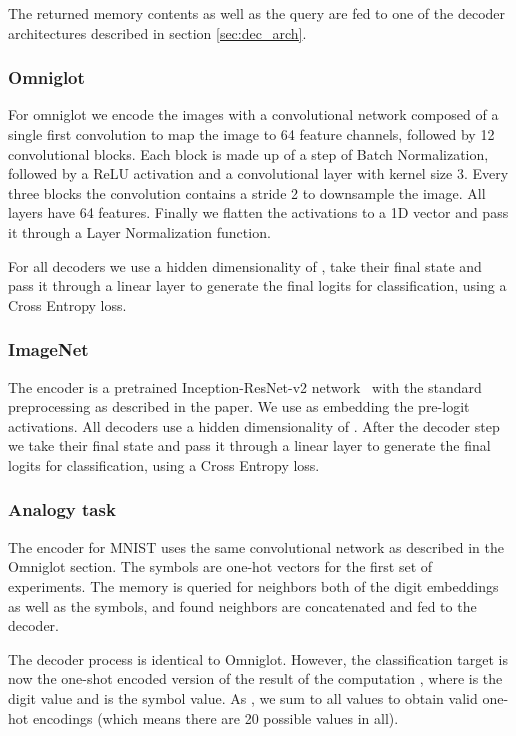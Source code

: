 \documentclass{article} \usepackage{iclr2019_conference,times}
\begin{document}
The returned memory contents as well as the query are fed to one of the decoder architectures described in section \ref{sec:dec_arch}.

\subsubsection{Omniglot}

For omniglot we encode the images with a convolutional network composed of a single first convolution to map the image to 64 feature channels, followed by 12 convolutional blocks. Each block is made up of a step of Batch Normalization, followed by a ReLU activation and a convolutional layer with kernel size 3. Every three blocks the convolution contains a stride 2 to downsample the image. All layers have 64 features. Finally we flatten the activations to a 1D vector and pass it through a Layer Normalization function.

For all decoders we use a hidden dimensionality of , take their final state and pass it through a linear layer to generate the final logits for classification, using a Cross Entropy loss.

\subsubsection{ImageNet}

The encoder is a pretrained Inception-ResNet-v2 network~\citep{szegedy2017inception} with the standard preprocessing as described in the paper. We use as embedding the pre-logit activations. All decoders use a hidden dimensionality of . After the decoder step we take their final state and pass it through a linear layer to generate the final logits for classification, using a Cross Entropy loss.

\subsubsection{Analogy task}

The encoder for MNIST uses the same convolutional network as described in the Omniglot section. The symbols are one-hot vectors for the first set of experiments. The memory is queried for neighbors both of the digit embeddings as well as the symbols, and found neighbors are concatenated and fed to the decoder.

The decoder process is identical to Omniglot. However, the classification target is now the one-shot encoded version of the result of the computation , where  is the digit value and  is the symbol value. As , we sum  to all values to obtain valid one-hot encodings (which means there are 20 possible values in all).
\end{document}
